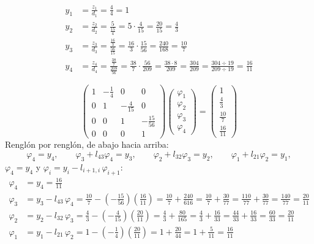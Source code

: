 \begin{align*}
	y_1 &= \frac{z_1}{d_1} = \frac{4}{4} = 1\\
	y_2 &= \frac{z_2}{d_2} = \frac{5}{\frac{15}{4}} = 5\cdot\frac{4}{15} = \frac{20}{15} = \frac43\\
	y_3 &= \frac{z_3}{d_3} = \frac{\frac{16}{3}}{\frac{56}{15}} = \frac{16}{3}\cdot\frac{15}{56} = \frac{240}{168} = \frac{10}{7}\\
	y_4 &= \frac{z_4}{d_4} = \frac{\frac{38}{7}}{\frac{209}{56}} = \frac{38}{7}\cdot\frac{56}{209} = \frac{38\cdot 8}{209} = \frac{304}{209} = \frac{304 \div 19}{209 \div 19} = \frac{16}{11}
\end{align*}

\[
\begin{pmatrix} 1 & -\frac14 & 0 & 0\\[3pt] 0 & 1 & -\frac{4}{15} & 0\\[3pt] 0 & 0 & 1 & -\frac{15}{56}\\[3pt] 0 & 0 & 0 & 1 \end{pmatrix}
\begin{pmatrix} \varphi_1\\ \varphi_2\\ \varphi_3\\ \varphi_4 \end{pmatrix}
= \begin{pmatrix} 1\\[3pt] \frac43\\[3pt] \frac{10}{7}\\[3pt] \frac{16}{11} \end{pmatrix}
\]
Renglón por renglón, de abajo hacia arriba:
\[
\varphi_4 = y_4, \qquad \varphi_3 + l_{43}\varphi_4 = y_3, \qquad
\varphi_2 + l_{32}\varphi_3 = y_2, \qquad \varphi_1 + l_{21}\varphi_2 = y_1,
\]
$\varphi_4 = y_4$ y $\varphi_i = y_i - l_{i+1,i}\,\varphi_{i+1}$:
\begin{align*}
	\varphi_4 &= y_4 = \frac{16}{11}\\
	\varphi_3 &= y_3 - l_{43}\,\varphi_4 = \frac{10}{7} - \left(-\frac{15}{56}\right)\left(\frac{16}{11}\right)
	= \frac{10}{7} + \frac{240}{616} = \frac{10}{7} + \frac{30}{77}
	= \frac{110}{77} + \frac{30}{77} = \frac{140}{77} = \frac{20}{11}\\
	\varphi_2 &= y_2 - l_{32}\,\varphi_3 = \frac43 - \left(-\frac{4}{15}\right)\left(\frac{20}{11}\right)
	= \frac43 + \frac{80}{165} = \frac43 + \frac{16}{33}
	= \frac{44}{33} + \frac{16}{33} = \frac{60}{33} = \frac{20}{11}\\
	\varphi_1 &= y_1 - l_{21}\,\varphi_2 = 1 - \left(-\frac14\right)\left(\frac{20}{11}\right)
	= 1 + \frac{20}{44} = 1 + \frac{5}{11} = \frac{16}{11}
\end{align*}

